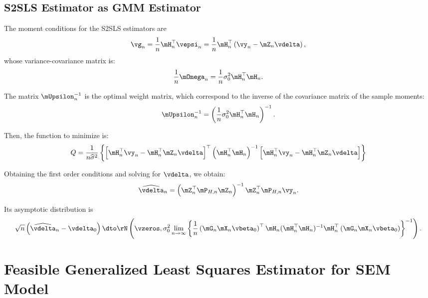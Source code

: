 \subsection{S2SLS Estimator as GMM Estimator}

The moment conditions for the S2SLS estimators are
\begin{equation*}
\vg_n = \frac{1}{n}\mH^\top_n\vepsi_n= \frac{1}{n}\mH^\top_n\left(\vy_n - \mZ_n\vdelta\right),
\end{equation*}
%
whose variance-covariance matrix is:
\begin{equation*}
 \frac{1}{n}\mOmega_n = \frac{1}{n}\sigma_0^2\mH_n^\top\mH_n.
\end{equation*}

The matrix $\mUpsilon_n^{-1}$ is the optimal weight matrix, which correspond to the inverse of the covariance matrix of the sample moments: 
\begin{equation*}
	\mUpsilon_n^{-1} = \left(\frac{1}{n}\sigma_0^2\mH_n^\top\mH_n\right)^{-1}.
\end{equation*}

Then, the function to minimize is:
\begin{equation*}
		Q  = \frac{1}{n\widehat{\sigma}^2}\left\lbrace \left[\mH^\top_n\vy_n - \mH^\top_n\mZ_n\vdelta\right]^\top\left(\mH^\top_n\mH_n\right)^{-1}\left[\mH^\top_n\vy_n - \mH^\top_n\mZ_n\vdelta\right]\right\rbrace 
\end{equation*}

Obtaining the first order conditions and solving for $\vdelta$, we obtain:
\begin{equation}
  \widehat{\vdelta}_{n} = \left(\mZ^\top_n\mP_{H,n}\mZ_n\right)^{-1}\mZ^\top_n\mP_{H, n}\vy_n. 
\end{equation}

Its asymptotic distribution is
\begin{equation*}
  \sqrt{n}\left(\widehat{\vdelta}_{n} - \vdelta_0\right)\dto \rN\left(\vzeros, \sigma_0^2\lim_{n\to\infty}\left\lbrace \frac{1}{n}\left(\mG_n\mX_n\vbeta_0\right)^\top \mH_n(\mH_n^\top\mH_n)^{-1}\mH_n^\top\left(\mG_n\mX_n\vbeta_0\right)\right\rbrace^{-1}\right).
\end{equation*}

\section{Feasible Generalized Least Squares Estimator for SEM Model}\label{sec:sfgls-sem}

